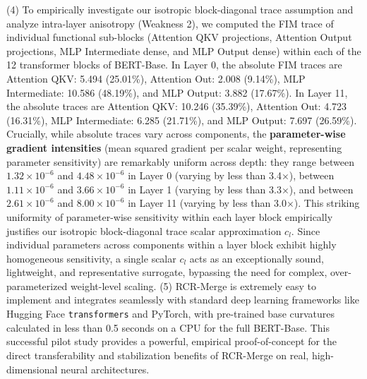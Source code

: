 (4) To empirically investigate our isotropic block-diagonal trace assumption and analyze intra-layer anisotropy (Weakness 2), we computed the FIM trace of individual functional sub-blocks (Attention QKV projections, Attention Output projections, MLP Intermediate dense, and MLP Output dense) within each of the 12 transformer blocks of BERT-Base. In Layer 0, the absolute FIM traces are Attention QKV: 5.494 (25.01\%), Attention Out: 2.008 (9.14\%), MLP Intermediate: 10.586 (48.19\%), and MLP Output: 3.882 (17.67\%). In Layer 11, the absolute traces are Attention QKV: 10.246 (35.39\%), Attention Out: 4.723 (16.31\%), MLP Intermediate: 6.285 (21.71\%), and MLP Output: 7.697 (26.59\%). Crucially, while absolute traces vary across components, the \textbf{parameter-wise gradient intensities} (mean squared gradient per scalar weight, representing parameter sensitivity) are remarkably uniform across depth: they range between $1.32 \times 10^{-6}$ and $4.48 \times 10^{-6}$ in Layer 0 (varying by less than 3.4$\times$), between $1.11 \times 10^{-6}$ and $3.66 \times 10^{-6}$ in Layer 1 (varying by less than 3.3$\times$), and between $2.61 \times 10^{-6}$ and $8.00 \times 10^{-6}$ in Layer 11 (varying by less than 3.0$\times$). This striking uniformity of parameter-wise sensitivity within each layer block empirically justifies our isotropic block-diagonal trace scalar approximation $c_l$. Since individual parameters across components within a layer block exhibit highly homogeneous sensitivity, a single scalar $c_l$ acts as an exceptionally sound, lightweight, and representative surrogate, bypassing the need for complex, over-parameterized weight-level scaling.
(5) RCR-Merge is extremely easy to implement and integrates seamlessly with standard deep learning frameworks like Hugging Face \texttt{transformers} and PyTorch, with pre-trained base curvatures calculated in less than 0.5 seconds on a CPU for the full BERT-Base. This successful pilot study provides a powerful, empirical proof-of-concept for the direct transferability and stabilization benefits of RCR-Merge on real, high-dimensional neural architectures.

